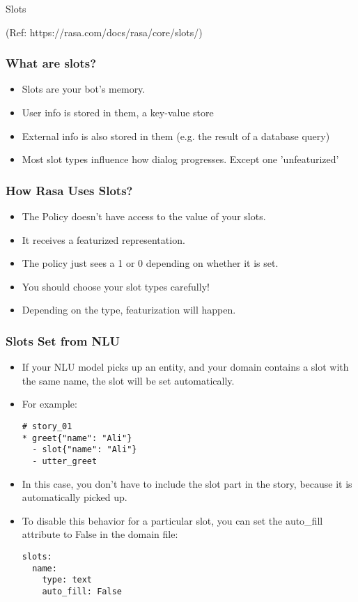 \begin{frame}[fragile]\frametitle{}
\begin{center}
{\Large Slots}

{\tiny (Ref: https://rasa.com/docs/rasa/core/slots/)}
\end{center}
\end{frame}

 \begin{frame}[fragile]\frametitle{What are slots?}
\begin{itemize}
\item Slots are your bot's memory.
\item User info is stored in them, a key-value store
\item External info is also stored in them (e.g. the result of a database query)
\item Most slot types influence how dialog progresses. Except one 'unfeaturized'
\end{itemize}
\end{frame}


 \begin{frame}[fragile]\frametitle{How Rasa Uses Slots?}
\begin{itemize}
\item The Policy doesn’t have access to the value of your slots. 
\item It receives a featurized representation.
\item The policy just sees a 1 or 0 depending on whether it is set.
\item You should choose your slot types carefully!
\item Depending on the type, featurization will happen.
\end{itemize}
\end{frame}


 \begin{frame}[fragile]\frametitle{Slots Set from NLU}
\begin{itemize}
\item If your NLU model picks up an entity, and your domain contains a slot with the same name, the slot will be set automatically. 
\item For example:
\begin{lstlisting}
# story_01
* greet{"name": "Ali"}
  - slot{"name": "Ali"}
  - utter_greet
\end{lstlisting}
\item In this case, you don’t have to include the \- slot{} part in the story, because it is automatically picked up.
\item To disable this behavior for a particular slot, you can set the auto\_fill attribute to False in the domain file:
\begin{lstlisting}
slots:
  name:
    type: text
    auto_fill: False
\end{lstlisting}
\end{itemize}
\end{frame}

